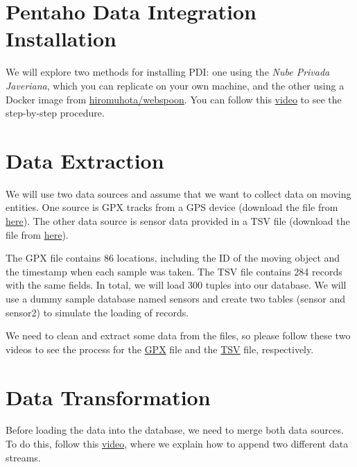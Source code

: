 \documentclass{article}
\begin{document}
\section{Pentaho Data Integration Installation}
We will explore two methods for installing PDI: one using the \textit{Nube Privada Javeriana}, which you can replicate on your own machine, and the other using a Docker image from \href{https://hub.docker.com/r/hiromuhota/webspoon/}{hiromuhota/webspoon}. You can follow this \href{https://drive.google.com/file/d/10TFCXvl7-7Xs-pISO8_RyQS0WkicoHhC/view?usp=drive_link}{video} to see the step-by-step procedure.

\section{Data Extraction}
We will use two data sources and assume that we want to collect data on moving entities. One source is GPX tracks from a GPS device (download the file from \href{https://drive.google.com/file/d/1eyb5l5RjimtkEdgKsqet2AVUfHqBydWK/view?usp=drive_link}{here}). The other data source is sensor data provided in a TSV file (download the file from \href{https://drive.google.com/file/d/13r72OnZu4TZc1HqLNFjZMOkkXk5kWRDt/view?usp=drive_link}{here}).

The GPX file contains 86 locations, including the ID of the moving object and the timestamp when each sample was taken. The TSV file contains 284 records with the same fields. In total, we will load 300 tuples into our database. We will use a dummy sample database named sensors and create two tables (sensor and sensor2) to simulate the loading of records.

We need to clean and extract some data from the files, so please follow these two videos to see the process for the \href{https://drive.google.com/file/d/1-3AYopykAj_XVb12UHlbSCvJ0ozEx8tO/view?usp=sharing}{GPX} file and the \href{https://drive.google.com/file/d/1fNWGFPNufY0PBSzRQeEaHNfhFgpkC29a/view?usp=drive_link}{TSV} file, respectively.

\section{Data Transformation}
Before loading the data into the database, we need to merge both data sources. To do this, follow this \href{https://drive.google.com/file/d/1Vxy3xEdjDLd5ZCSYHBnQO-yoWGkRpUQD/view?usp=drive_link}{video}, where we explain how to append two different data streams.
\end{document}
